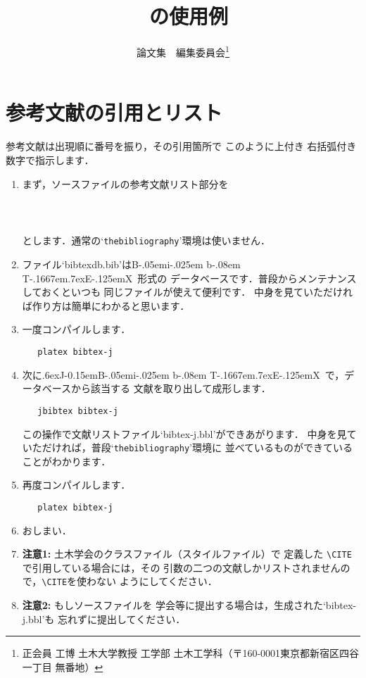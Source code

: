\documentclass{jsce}
\title{\BibTeX\ の使用例}
\author{論文集　編集委員会\thanks{正会員 工博 土木大学教授 工学部
土木工学科（〒160-0001東京都新宿区四谷一丁目
無番地）\email{your_name@foo.ac.jp}}}
\def\BibTeX{{\rm B\kern-.05em{\sc i\kern-.025em b}\kern-.08em
    T\kern-.1667em\lower.7ex\hbox{E}\kern-.125emX}}
\def\JBibTeX{\leavevmode\lower .6ex\hbox{J}\kern-0.15em\BibTeX}
\begin{document}
\maketitle

\section{参考文献の引用とリスト}

参考文献は出現順に番号を振り，その引用箇所で
このように\cite{Asaro,antmanrod}上付き
右括弧付き数字\cite{hillbook}で指示します．

\begin{enumerate}
\item まず，ソースファイルの参考文献リスト部分を
\begin{verbatim}
   
   
\end{verbatim}
とします．通常の`{\tt thebibliography}'環境は使いません．
\item ファイル`bibtexdb.bib'は\BibTeX\ 形式の
データベースです．普段からメンテナンスしておくといつも
同じファイルが使えて便利です．
中身を見ていただければ作り方は簡単にわかると思います．
\lastpagecontrol[1cm]{6.5cm}
\item 一度コンパイルします．
\begin{verbatim}
   platex bibtex-j
\end{verbatim}
\item 次に\JBibTeX\ で，データベースから該当する
文献を取り出して成形します．
\begin{verbatim}
   jbibtex bibtex-j
\end{verbatim}
この操作で文献リストファイル`bibtex-j.bbl'ができあがります．
中身を見ていただければ，普段`{\tt thebibliography}'環境に
並べているものができていることがわかります．
\item 再度コンパイルします．
\begin{verbatim}
   platex bibtex-j
\end{verbatim}
\item おしまい．
\item {\bf 注意1:} 土木学会のクラスファイル（スタイルファイル）で
定義した \verb+\CITE+で引用している場合には，その
引数の二つの文献しかリストされませんので，\verb+\CITE+を使わない
ようにしてください．
\item {\bf 注意2:} もしソースファイルを
学会等に提出する場合は，生成された`bibtex-j.bbl'も
忘れずに提出してください．
\end{enumerate}




\lastpagesettings
\end{document}
